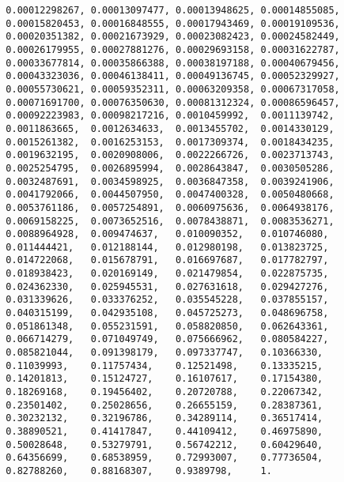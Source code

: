 \begin{Verbatim}
  0.00012298267, 0.00013097477, 0.00013948625, 0.00014855085,
  0.00015820453, 0.00016848555, 0.00017943469, 0.00019109536,
  0.00020351382, 0.00021673929, 0.00023082423, 0.00024582449,
  0.00026179955, 0.00027881276, 0.00029693158, 0.00031622787,
  0.00033677814, 0.00035866388, 0.00038197188, 0.00040679456,
  0.00043323036, 0.00046138411, 0.00049136745, 0.00052329927,
  0.00055730621, 0.00059352311, 0.00063209358, 0.00067317058,
  0.00071691700, 0.00076350630, 0.00081312324, 0.00086596457,
  0.00092223983, 0.00098217216, 0.0010459992,  0.0011139742,
  0.0011863665,  0.0012634633,  0.0013455702,  0.0014330129,
  0.0015261382,  0.0016253153,  0.0017309374,  0.0018434235,
  0.0019632195,  0.0020908006,  0.0022266726,  0.0023713743,
  0.0025254795,  0.0026895994,  0.0028643847,  0.0030505286,
  0.0032487691,  0.0034598925,  0.0036847358,  0.0039241906,
  0.0041792066,  0.0044507950,  0.0047400328,  0.0050480668,
  0.0053761186,  0.0057254891,  0.0060975636,  0.0064938176,
  0.0069158225,  0.0073652516,  0.0078438871,  0.0083536271,
  0.0088964928,  0.009474637,   0.010090352,   0.010746080,
  0.011444421,   0.012188144,   0.012980198,   0.013823725,
  0.014722068,   0.015678791,   0.016697687,   0.017782797,
  0.018938423,   0.020169149,   0.021479854,   0.022875735,
  0.024362330,   0.025945531,   0.027631618,   0.029427276,
  0.031339626,   0.033376252,   0.035545228,   0.037855157,
  0.040315199,   0.042935108,   0.045725273,   0.048696758,
  0.051861348,   0.055231591,   0.058820850,   0.062643361,
  0.066714279,   0.071049749,   0.075666962,   0.080584227,
  0.085821044,   0.091398179,   0.097337747,   0.10366330,
  0.11039993,    0.11757434,    0.12521498,    0.13335215,
  0.14201813,    0.15124727,    0.16107617,    0.17154380,
  0.18269168,    0.19456402,    0.20720788,    0.22067342,
  0.23501402,    0.25028656,    0.26655159,    0.28387361,
  0.30232132,    0.32196786,    0.34289114,    0.36517414,
  0.38890521,    0.41417847,    0.44109412,    0.46975890,
  0.50028648,    0.53279791,    0.56742212,    0.60429640,
  0.64356699,    0.68538959,    0.72993007,    0.77736504,
  0.82788260,    0.88168307,    0.9389798,     1.
\end{Verbatim}
